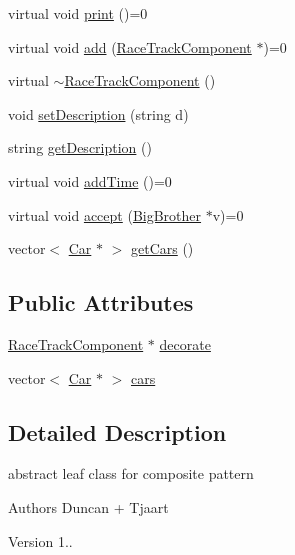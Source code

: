 \begin{DoxyCompactItemize}
\item 
virtual void \mbox{\hyperlink{class_race_track_component_a02a8d9520cfd80f31dd94b5fa1e76d47}{print}} ()=0
\item 
virtual void \mbox{\hyperlink{class_race_track_component_af89a6b453dfd3fb39fce27576012106f}{add}} (\mbox{\hyperlink{class_race_track_component}{Race\+Track\+Component}} $\ast$)=0
\item 
virtual \mbox{\hyperlink{class_race_track_component_a9f99da5f33311cce756f496a7d9e3f1f}{$\sim$\+Race\+Track\+Component}} ()
\item 
void \mbox{\hyperlink{class_race_track_component_a03d5e6e6758dcf89bee2f4160d18a9eb}{set\+Description}} (string d)
\item 
string \mbox{\hyperlink{class_race_track_component_a443780d8534a8799fbcde14aa7b540c2}{get\+Description}} ()
\item 
virtual void \mbox{\hyperlink{class_race_track_component_aa815404c45ba7df3786c3add177eb7e6}{add\+Time}} ()=0
\item 
virtual void \mbox{\hyperlink{class_race_track_component_aed0a0197b7bc8de3f681484819b59df6}{accept}} (\mbox{\hyperlink{class_big_brother}{Big\+Brother}} $\ast$v)=0
\item 
vector$<$ \mbox{\hyperlink{class_car}{Car}} $\ast$ $>$ \mbox{\hyperlink{class_race_track_component_a5bb16c76fd5335c9d1a951b9de5ea48c}{get\+Cars}} ()
\end{DoxyCompactItemize}
\subsection*{Public Attributes}
\begin{DoxyCompactItemize}
\item 
\mbox{\hyperlink{class_race_track_component}{Race\+Track\+Component}} $\ast$ \mbox{\hyperlink{class_race_track_component_ad5b40b7d85b7369e1aaf5ce8c3448128}{decorate}}
\item 
vector$<$ \mbox{\hyperlink{class_car}{Car}} $\ast$ $>$ \mbox{\hyperlink{class_race_track_component_a7ac8e22cd540bed371efab3e47ebe49b}{cars}}
\end{DoxyCompactItemize}


\subsection{Detailed Description}
abstract leaf class for composite pattern 

\begin{DoxyAuthor}{Authors}
Duncan + Tjaart 
\end{DoxyAuthor}
\begin{DoxyVersion}{Version}
1.. 
\end{DoxyVersion}


